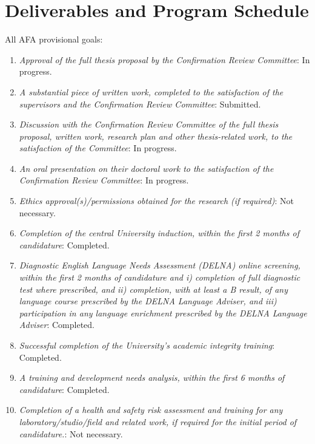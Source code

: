 \documentclass[12pt,a4paper]{article}
\begin{document}
\section{Deliverables and Program Schedule}
All AFA provisional goals:
\begin{enumerate}


\item
\textit{Approval of the full thesis proposal by the Confirmation Review Committee}: In progress.


\item
\textit{A substantial piece of written work, completed to the satisfaction of the supervisors and the Confirmation Review
Committee}: Submitted.


\item
\textit{Discussion with the Confirmation Review Committee of the full thesis proposal, written work, research plan and other
thesis-related work, to the satisfaction of the Committee}:
In progress.

\item
\textit{An oral presentation on their doctoral work to the satisfaction of the Confirmation Review Committee}:
In progress.

\item
\textit{Ethics approval(s)/permissions obtained for the research
(if required)}:
Not necessary.

\item
\textit{Completion of the central University induction, within the first 2 months of candidature}:
Completed.


\item
\textit{Diagnostic English Language Needs Assessment (DELNA) online screening, within the first 2 months of candidature and
i) completion of full diagnostic test where prescribed, and
ii) completion, with at least a B result, of any language course prescribed by the DELNA Language Adviser, and
iii) participation in any language enrichment prescribed by the DELNA Language Adviser}:
Completed.


\item
\textit{Successful completion of the University’s academic integrity training}:
Completed.



\item
\textit{A training and development needs analysis, within the first 6 months of candidature}:
Completed.


\item
\textit{Completion of a health and safety risk assessment and training for any laboratory/studio/field and related work, if
required for the initial period of candidature.}:
Not necessary.




\end{enumerate}
\end{document}
